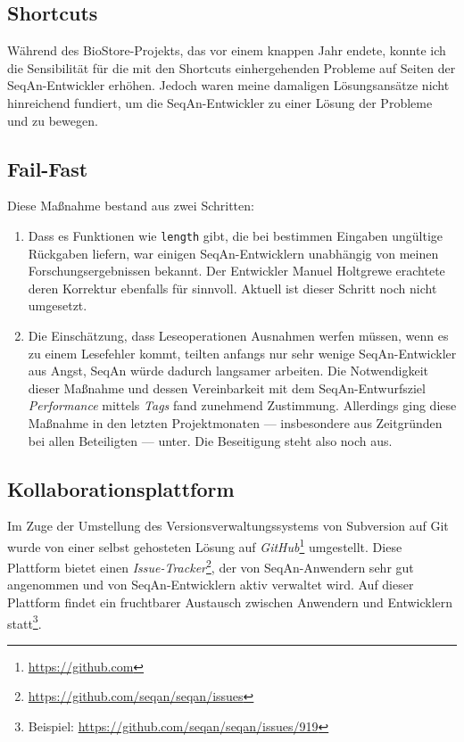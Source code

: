 \subsection{Shortcuts}

Während des BioStore-Projekts, das vor einem knappen Jahr endete, konnte ich die Sensibilität für die mit den Shortcuts einhergehenden Probleme auf Seiten der SeqAn-Entwickler erhöhen. Jedoch waren meine damaligen Lösungsansätze nicht hinreichend fundiert, um die SeqAn-Entwickler zu einer Lösung der Probleme  und  zu bewegen.



\subsection{Fail-Fast}

Diese Maßnahme bestand aus zwei Schritten:
\begin{enumerate}
  \item Dass es Funktionen wie \texttt{length} gibt, die bei bestimmen Eingaben ungültige Rückgaben liefern, war einigen SeqAn-Entwicklern unabhängig von meinen Forschungsergebnissen bekannt. Der Entwickler Manuel Holtgrewe erachtete deren Korrektur ebenfalls für sinnvoll. Aktuell ist dieser Schritt noch nicht umgesetzt.
  \item Die Einschätzung, dass Leseoperationen Ausnahmen werfen müssen, wenn es zu einem Lesefehler kommt, teilten anfangs nur sehr wenige SeqAn-Entwickler aus Angst, SeqAn würde dadurch langsamer arbeiten. Die Notwendigkeit dieser Maßnahme und dessen Vereinbarkeit mit dem SeqAn-Entwurfsziel \textit{Performance} mittels \textit{Tags} fand zunehmend Zustimmung. Allerdings ging diese Maßnahme in den letzten Projektmonaten --- insbesondere aus Zeitgründen bei allen Beteiligten --- unter. Die Beseitigung steht also noch aus.
\end{enumerate}







\subsection{Kollaborationsplattform}

Im Zuge der Umstellung des Versionsverwaltungssystems von Subversion auf Git wurde von einer selbst gehosteten Lösung auf \textit{GitHub}\footnote{\url{https://github.com}} umgestellt. Diese Plattform bietet einen \textit{Issue-Tracker}\footnote{\url{https://github.com/seqan/seqan/issues}}, der von SeqAn-Anwendern sehr gut angenommen und von SeqAn-Entwicklern aktiv verwaltet wird. Auf dieser Plattform findet ein fruchtbarer Austausch zwischen Anwendern und Entwicklern statt\footnote{Beispiel: \url{https://github.com/seqan/seqan/issues/919}}. 


